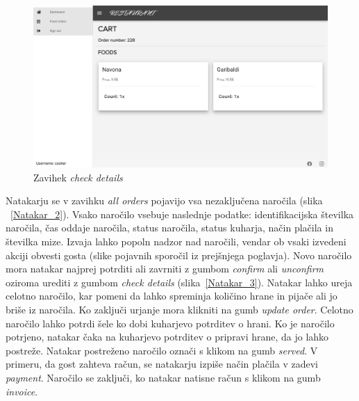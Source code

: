 \documentclass[a4paper, 12pt]{book}
\begin{document}
\begin{figure}[!htb]
\begin{center}
\includegraphics[width=13cm]{cooker_2.jpg}
\caption{Zavihek \textit{check details}}
\label{Kuhar_3}
\end{center}
\end{figure}

Natakarju se v zavihku \textit{all orders} pojavijo vsa nezaključena naročila (slika ~\ref{Natakar_2}). Vsako naročilo vsebuje naslednje podatke: identifikacijska številka naročila, čas oddaje naročila, status naročila, status kuharja, način plačila in številka mize. Izvaja lahko popoln nadzor nad naročili, vendar ob vsaki izvedeni akciji obvesti gosta (slike pojavnih sporočil iz prejšnjega poglavja). Novo naročilo mora natakar najprej potrditi ali zavrniti z gumbom \textit{confirm} ali \textit{unconfirm} oziroma urediti z gumbom \textit{check details} (slika~\ref{Natakar_3}). Natakar lahko ureja celotno naročilo, kar pomeni da lahko spreminja količino hrane in pijače ali jo briše iz naročila. Ko zaključi urjanje mora klikniti na gumb \textit{update order}. Celotno naročilo lahko potrdi šele ko dobi kuharjevo potrditev o hrani. Ko je naročilo potrjeno, natakar čaka na kuharjevo potrditev o pripravi hrane, da jo lahko postreže. Natakar postreženo naročilo označi s klikom na gumb \textit{served}. V primeru, da gost zahteva račun, se natakarju izpiše način plačila v zadevi \textit{payment}. Naročilo se zaključi, ko natakar natisne račun s klikom na gumb \textit{invoice}.
\end{document}
